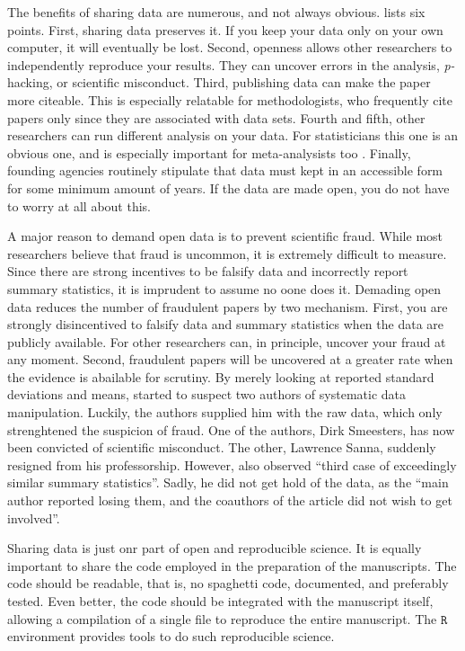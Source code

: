 The benefits of sharing data are numerous, and not always obvious.
\cite{Wicherts2012-cp} lists six points. First, sharing data preserves
it. If you keep your data only on your own computer, it will eventually
be lost. Second, openness allows other researchers to independently
reproduce your results. They can uncover errors in the analysis, \emph{p-}hacking,
or scientific misconduct. Third, publishing data can make the paper
more citeable. This is especially relatable for methodologists, who
frequently cite papers only since they are associated with data sets.
Fourth and fifth, other researchers can run different analysis on
your data. For statisticians this one is an obvious one, and is especially
important for meta-analysists too \parencite{Cooper2009-ge}. Finally,
founding agencies routinely stipulate that data must kept in an accessible
form for some minimum amount of years. If the data are made open,
you do not have to worry at all about this.

A major reason to demand open data is to prevent scientific fraud.
While most researchers believe that fraud is uncommon, it is extremely
difficult to measure. Since there are strong incentives to be falsify
data and incorrectly report summary statistics, it is imprudent to
assume no oone does it. Demading open data reduces the number of fraudulent
papers by two mechanism. First, you are strongly disincentived to
falsify data and summary statistics when the data are publicly available.
For other researchers can, in principle, uncover your fraud at any
moment. Second, fraudulent papers will be uncovered at a greater rate
when the evidence is abailable for scrutiny. By merely looking at
reported standard deviations and means, \cite{Simonsohn2013-ul}
started to suspect two authors of systematic data manipulation. Luckily,
the authors supplied him with the raw data, which only strenghtened
the suspicion of fraud. One of the authors, Dirk Smeesters, has now
been convicted of scientific misconduct. The other, Lawrence Sanna,
suddenly resigned from his professorship. However, \cite{Simonsohn2013-ul}
also observed ``third case of exceedingly similar summary statistics''.
Sadly, he did not get hold of the data, as the ``main author reported
losing them, and the coauthors of the article did not wish to get
involved''.

Sharing data is just onr part of open and reproducible science. It
is equally important to share the code employed in the preparation
of the manuscripts. The code should be readable, that is, no spaghetti
code, documented, and preferably tested. Even better, the code should
be integrated with the manuscript itself, allowing a compilation of
a single file to reproduce the entire manuscript. The $\mathtt{R}$
environment provides tools to do such reproducible science.

